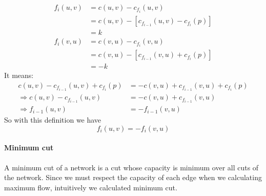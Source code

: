 \documentclass{book}
\begin{document}
	\begin{equation*}
		\begin{split}
		f_i(u, v) &= c(u, v) - c_{f_i}(u, v) \\
		&= c(u, v) - [c_{f_{i - 1}}(u, v) - c_{f_i}(p)] \\
		&= k
		\end{split}	
	\end{equation*}
	\begin{equation*}
		\begin{split}
		f_i(v, u) &= c(v, u) - c_{f_i}(v, u) \\
		&= c(v, u) - [c_{f_{i - 1}}(v, u) + c_{f_i}(p)] \\
		&= -k
		\end{split}
	\end{equation*}
	It means:
	\begin{equation*}
		\begin{split}
		c(u, v) - c_{f_{i - 1}}(u, v) + c_{f_i}(p) &= -c(v, u) + c_{f_{i - 1}}(v, u) + c_{f_i}(p)\\
		\Rightarrow c(u, v) - c_{f_{i - 1}}(u, v) &= -c(v, u) + c_{f_{i - 1}}(v, u) \\
		\Rightarrow f_{i - 1}(u, v) &= -f_{i - 1}(v, u)
		\end{split}
	\end{equation*}
	So with this definition we have
	\begin{equation}
		f_i(u, v) = -f_i(v, u)
	\end{equation}
	\paragraph{Minimum cut}
	A minimum cut of a network is a cut whose capacity is minimum over all cuts of the network. Since we must respect the capacity of each edge when we calculating maximum flow, intuitively we calculated minimum cut. 
\end{document}
